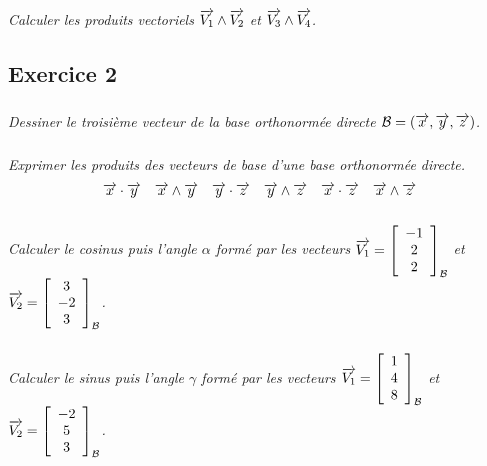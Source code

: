 \documentclass[11pt,oneside]{article}
\begin{document}
\subparagraph{}
\textit{Calculer les produits vectoriels $\overrightarrow{V_1}\wedge \overrightarrow{V_2}$ et  $\overrightarrow{V_3}\wedge \overrightarrow{V_4}$.}



\subsection*{Exercice 2}
\setcounter{subparagraph}{0}
\subparagraph{}
\textit{Dessiner le troisième vecteur de la base orthonormée directe $\mathcal{B}=\left(\overrightarrow{x},\overrightarrow{y},\overrightarrow{z}\right)$.}


\subparagraph{}
\textit{Exprimer les produits des vecteurs de base d'une base orthonormée directe.}
$$
\overrightarrow{x}\cdot\overrightarrow{y}
\quad
\overrightarrow{x}\wedge\overrightarrow{y}
\quad
\overrightarrow{y}\cdot\overrightarrow{z}
\quad
\overrightarrow{y}\wedge\overrightarrow{z}
\quad
\overrightarrow{x}\cdot\overrightarrow{z}
\quad
\overrightarrow{x}\wedge\overrightarrow{z}
$$


\subparagraph{}
\textit{Calculer le cosinus puis l'angle $\alpha$ formé par les vecteurs $\overrightarrow{V_1}=\left[\begin{array}{c}-1\\2\\2\end{array}\right]_{\mathcal{B}}$ et 
$\overrightarrow{V_2}=\left[\begin{array}{c}3\\-2\\3\end{array}\right]_{\mathcal{B}}$.}


\subparagraph{}
\textit{Calculer le sinus puis l'angle $\gamma$ formé par les vecteurs $\overrightarrow{V_1}=\left[\begin{array}{c}1\\4\\8\end{array}\right]_{\mathcal{B}}$ et 
$\overrightarrow{V_2}=\left[\begin{array}{c}-2\\5\\3\end{array}\right]_{\mathcal{B}}$.}
\end{document}
